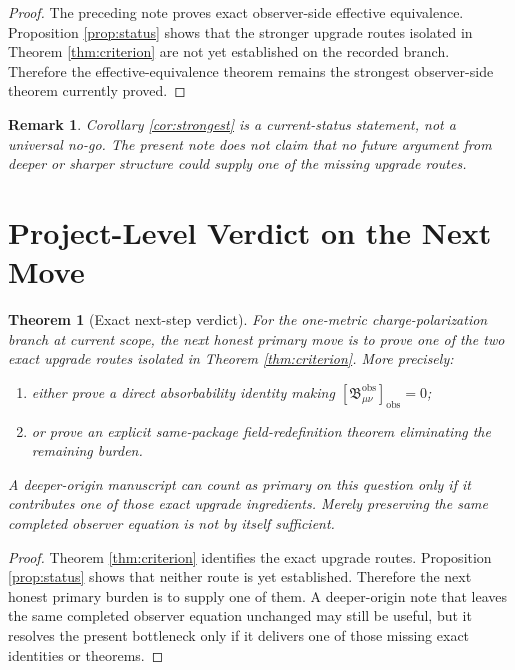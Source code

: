 \documentclass[11pt]{article}
\newcommand{\ObsBurden}{\mathfrak B_{\mu\nu}^{\mathrm{obs}}}
\newcommand{\ObserverClass}[1]{\left[#1\right]_{\mathrm{obs}}}
\newtheorem{remark}{Remark}
\newtheorem{theorem}{Theorem}
\begin{document}
\begin{proof}
The preceding note proves exact observer-side effective equivalence. Proposition \ref{prop:status} shows that the stronger upgrade routes isolated in Theorem \ref{thm:criterion} are not yet established on the recorded branch. Therefore the effective-equivalence theorem remains the strongest observer-side theorem currently proved.
\end{proof}

\begin{remark}
Corollary \ref{cor:strongest} is a current-status statement, not a universal no-go. The present note does not claim that no future argument from deeper or sharper structure could supply one of the missing upgrade routes.
\end{remark}

\section{Project-Level Verdict on the Next Move}

\begin{theorem}[Exact next-step verdict]
\label{thm:verdict}
For the one-metric charge-polarization branch at current scope, the next honest primary move is to prove one of the two exact upgrade routes isolated in Theorem \ref{thm:criterion}. More precisely:
\begin{enumerate}
    \item either prove a direct absorbability identity making \(\ObserverClass{\ObsBurden}=0\);
    \item or prove an explicit same-package field-redefinition theorem eliminating the remaining burden.
\end{enumerate}
A deeper-origin manuscript can count as primary on this question only if it contributes one of those exact upgrade ingredients. Merely preserving the same completed observer equation is not by itself sufficient.
\end{theorem}

\begin{proof}
Theorem \ref{thm:criterion} identifies the exact upgrade routes. Proposition \ref{prop:status} shows that neither route is yet established. Therefore the next honest primary burden is to supply one of them. A deeper-origin note that leaves the same completed observer equation unchanged may still be useful, but it resolves the present bottleneck only if it delivers one of those missing exact identities or theorems.
\end{proof}
\end{document}
